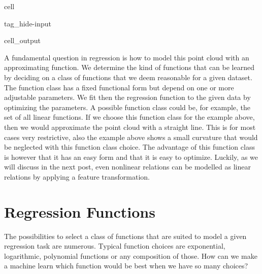 \documentclass[letterpaper,10pt,english]{jupyterBook}
\begin{document}
\begin{sphinxuseclass}{cell}
\begin{sphinxuseclass}{tag_hide-input}\begin{sphinxVerbatimOutput}

\begin{sphinxuseclass}{cell_output}
\noindent{}

\end{sphinxuseclass}\end{sphinxVerbatimOutput}

\end{sphinxuseclass}
\end{sphinxuseclass}
\sphinxAtStartPar
A fundamental question in regression is how to model this point cloud with an approximating function. We determine the kind of functions that can be learned by deciding on a class of functions that we deem reasonable for a given dataset. The function class has a fixed functional form but depend on one or more adjustable parameters. We fit then the regression function to the given data by optimizing the parameters. A possible function class could be, for example, the set of all linear functions. If we choose this function class for the example above, then we would approximate the point cloud with a straight line. This is for most cases very restrictive, also the example above shows a small curvature that would be neglected with this function class choice. The advantage of this function class is however that it has an easy form and that it is easy to optimize. Luckily, as we will discuss in the next post, even nonlinear relations can be modelled as linear relations by applying a feature transformation.

\sphinxstepscope


\section{Regression Functions}
\label{\detokenize{regression_functions:regression-functions}}\label{\detokenize{regression_functions::doc}}
\sphinxAtStartPar
The possibilities to select a class of functions that are suited to model a given regression task are numerous. Typical function choices are exponential, logarithmic, polynomial functions or any composition of those. How can we make a machine learn which function would be best when we have so many choices?
\end{document}
